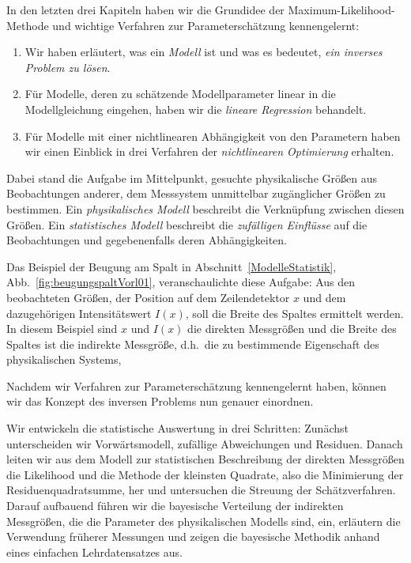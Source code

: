 
In den letzten drei Kapiteln haben wir die Grundidee der
Maximum-Likelihood-Methode und wichtige Verfahren zur Parameterschätzung
kennengelernt:
\begin{enumerate}
\item Wir haben erläutert, was ein \textsl{Modell} ist und was es bedeutet, \textsl{ein inverses Problem zu lösen}.
\item Für Modelle, deren zu schätzende Modellparameter linear in die Modellgleichung
eingehen, haben wir die \textsl{lineare Regression} behandelt.
\item Für Modelle mit einer nichtlinearen Abhängigkeit von den Parametern
haben wir einen Einblick in drei Verfahren der \textsl{nichtlinearen Optimierung} erhalten.
\end{enumerate}
Dabei stand die Aufgabe im Mittelpunkt, gesuchte physikalische Größen aus
Beobachtungen anderer, dem Messsystem unmittelbar zugänglicher Größen zu
bestimmen. Ein \textsl{physikalisches Modell} beschreibt die Verknüpfung zwischen diesen Größen. Ein \textsl{statistisches Modell} beschreibt die \textsl{zufälligen Einflüsse} auf die Beobachtungen und gegebenenfalls deren Abhängigkeiten.

Das Beispiel der Beugung am Spalt in Abschnitt~\ref{ModelleStatistik}, Abb.\ \ref{fig:beugungspaltVorl01}, veranschaulichte diese Aufgabe: Aus den beobachteten Größen, der Position auf dem Zeilendetektor $x$ und dem dazugehörigen Intensitätswert $I(x)$, soll die Breite des Spaltes ermittelt werden. In diesem Beispiel sind $x$ und $I(x)$ die direkten Messgrößen und die Breite des Spaltes ist die indirekte Messgröße, d.h.\ die zu bestimmende Eigenschaft des physikalischen Systems,

Nachdem wir Verfahren zur Parameterschätzung kennengelernt haben, können wir das Konzept des inversen Problems nun genauer einordnen.

Wir entwickeln die statistische Auswertung in drei Schritten:
Zunächst unterscheiden wir Vorwärtsmodell, zufällige Abweichungen und
Residuen. Danach leiten wir aus dem Modell zur statistischen Beschreibung der direkten Messgrößen die Likelihood
und die \glqq Methode der kleinsten Quadrate\grqq, also die Minimierung der Residuenquadratsumme, her und untersuchen die Streuung
der Schätzverfahren. Darauf aufbauend führen wir die bayesische
Verteilung der indirekten Messgrößen, die die Parameter des physikalischen Modells sind, ein, erläutern die Verwendung früherer Messungen
und zeigen die bayesische Methodik anhand eines einfachen Lehrdatensatzes aus.

